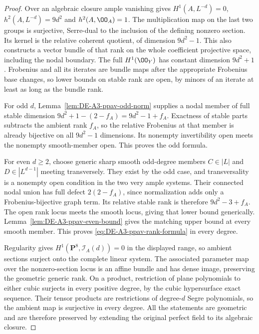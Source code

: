 \begin{proof}
Over an algebraic closure ample vanishing gives
$H^1(A,L^{-d})=0$, $h^2(A,L^{-d})=9d^2$ and $h^2(A,\OO_A)=1$.
The multiplication map on the last two groups is surjective, Serre-dual
to the inclusion of the defining nonzero section.  Its kernel is the
relative coherent quotient, of dimension $9d^2-1$.  This also constructs
a vector bundle of that rank on the whole coefficient projective space,
including the nodal boundary.  The full $H^1(\OO_Y)$ has constant
dimension $9d^2+1$.  Frobenius and all its iterates are bundle maps after
the appropriate Frobenius base changes, so lower bounds on stable rank
are open, by minors of an iterate at least as long as the bundle rank.

For odd $d$, Lemma~\ref{lem:DE-A3-ppav-odd-norm} supplies a nodal
member of full stable dimension
$9d^2+1-(2-f_A)=9d^2-1+f_A$.
Exactness of stable parts subtracts the ambient rank $f_A$, so the
relative Frobenius at that member is already bijective on all
$9d^2-1$ dimensions.  Its nonempty invertibility open meets the
nonempty smooth-member open.  This proves the odd formula.

For even $d\ge2$, choose generic sharp smooth odd-degree members
$C\in|L|$ and $D\in|L^{d-1}|$ meeting transversely.  They exist by
the odd case, and transversality is a nonempty open condition in the
two very ample systems.  Their connected nodal union has full defect
$2(2-f_A)$, since normalization adds only a Frobenius-bijective graph
term.  Its relative stable rank is therefore $9d^2-3+f_A$.
The open rank locus meets the smooth locus, giving that lower bound
generically.  Lemma~\ref{lem:DE-A3-ppav-even-bound} gives the matching
upper bound at every smooth member.  This proves
\eqref{eq:DE-A3-ppav-rank-formula} in every degree.

Regularity gives $H^1(\mathbf P^8,\mathcal I_A(d))=0$ in the displayed
range, so ambient sections surject onto the complete linear system.
The associated parameter map over the nonzero-section locus is an
affine bundle and has dense image, preserving the geometric generic
rank.  On a product, restriction of plane polynomials to either cubic
surjects in every positive degree, by the cubic hypersurface exact
sequence.  Their tensor products are restrictions of degree-$d$ Segre
polynomials, so the ambient map is surjective in every degree.
All the statements are geometric and are therefore preserved by
extending the original perfect field to its algebraic closure.
\end{proof}

